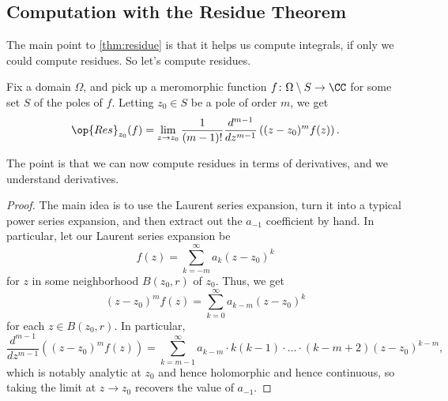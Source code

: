 \documentclass[../notes.tex]{subfiles}
\begin{document}
\subsection{Computation with the Residue Theorem}
The main point to \autoref{thm:residue} is that it helps us compute integrals, if only we could compute residues. So let's compute residues.
\begin{lemma}
	Fix a domain $\Omega$, and pick up a meromorphic function $f\colon \Omega\setminus S\to\CC$ for some set $S$ of the poles of $f$. Letting $z_0\in S$ be a pole of order $m$, we get
	\[\op{Res}_{z_0}(f)=\lim_{z\to z_0}\frac1{(m-1)!}\frac{d^{m-1}}{dz^{m-1}}\left((z-z_0)^mf(z)\right).\]
\end{lemma}
The point is that we can now compute residues in terms of derivatives, and we understand derivatives.
\begin{proof}
	The main idea is to use the Laurent series expansion, turn it into a typical power series expansion, and then extract out the $a_{-1}$ coefficient by hand. In particular, let our Laurent series expansion be
	\[f(z)=\sum_{k=-m}^\infty a_k(z-z_0)^k\]
	for $z$ in some neighborhood $B(z_0,r)$ of $z_0$. Thus, we get
	\[(z-z_0)^mf(z)=\sum_{k=0}^\infty a_{k-m}(z-z_0)^k\]
	for each $z\in B(z_0,r)$. In particular,
	\[\frac{d^{m-1}}{dz^{m-1}}\left((z-z_0)^mf(z)\right)=\sum_{k=m-1}^\infty a_{k-m}\cdot k(k-1)\cdot\ldots\cdot(k-m+2)(z-z_0)^{k-m},\]
	which is notably analytic at $z_0$ and hence holomorphic and hence continuous, so taking the limit at $z\to z_0$ recovers the value of $a_{-1}$.
\end{proof}
\end{document}
